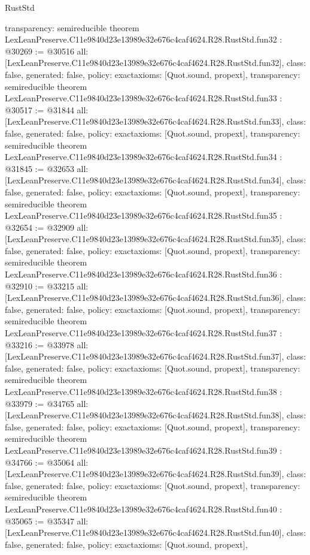 \begin{lexlean}{RustStd}
\begin{coremodule}
{  transparency: semireducible
}
theorem LexLeanPreserve.C11e9840d23e13989e32e676c4caf4624.R28.RustStd.fun32 : @30269 := @30516 {
  all: [LexLeanPreserve.C11e9840d23e13989e32e676c4caf4624.R28.RustStd.fun32],
  class: false,
  generated: false,
  policy: exact{axioms: [Quot.sound, propext]},
  transparency: semireducible
}
theorem LexLeanPreserve.C11e9840d23e13989e32e676c4caf4624.R28.RustStd.fun33 : @30517 := @31844 {
  all: [LexLeanPreserve.C11e9840d23e13989e32e676c4caf4624.R28.RustStd.fun33],
  class: false,
  generated: false,
  policy: exact{axioms: [Quot.sound, propext]},
  transparency: semireducible
}
theorem LexLeanPreserve.C11e9840d23e13989e32e676c4caf4624.R28.RustStd.fun34 : @31845 := @32653 {
  all: [LexLeanPreserve.C11e9840d23e13989e32e676c4caf4624.R28.RustStd.fun34],
  class: false,
  generated: false,
  policy: exact{axioms: [Quot.sound, propext]},
  transparency: semireducible
}
theorem LexLeanPreserve.C11e9840d23e13989e32e676c4caf4624.R28.RustStd.fun35 : @32654 := @32909 {
  all: [LexLeanPreserve.C11e9840d23e13989e32e676c4caf4624.R28.RustStd.fun35],
  class: false,
  generated: false,
  policy: exact{axioms: [Quot.sound, propext]},
  transparency: semireducible
}
theorem LexLeanPreserve.C11e9840d23e13989e32e676c4caf4624.R28.RustStd.fun36 : @32910 := @33215 {
  all: [LexLeanPreserve.C11e9840d23e13989e32e676c4caf4624.R28.RustStd.fun36],
  class: false,
  generated: false,
  policy: exact{axioms: [Quot.sound, propext]},
  transparency: semireducible
}
theorem LexLeanPreserve.C11e9840d23e13989e32e676c4caf4624.R28.RustStd.fun37 : @33216 := @33978 {
  all: [LexLeanPreserve.C11e9840d23e13989e32e676c4caf4624.R28.RustStd.fun37],
  class: false,
  generated: false,
  policy: exact{axioms: [Quot.sound, propext]},
  transparency: semireducible
}
theorem LexLeanPreserve.C11e9840d23e13989e32e676c4caf4624.R28.RustStd.fun38 : @33979 := @34765 {
  all: [LexLeanPreserve.C11e9840d23e13989e32e676c4caf4624.R28.RustStd.fun38],
  class: false,
  generated: false,
  policy: exact{axioms: [Quot.sound, propext]},
  transparency: semireducible
}
theorem LexLeanPreserve.C11e9840d23e13989e32e676c4caf4624.R28.RustStd.fun39 : @34766 := @35064 {
  all: [LexLeanPreserve.C11e9840d23e13989e32e676c4caf4624.R28.RustStd.fun39],
  class: false,
  generated: false,
  policy: exact{axioms: [Quot.sound, propext]},
  transparency: semireducible
}
theorem LexLeanPreserve.C11e9840d23e13989e32e676c4caf4624.R28.RustStd.fun40 : @35065 := @35347 {
  all: [LexLeanPreserve.C11e9840d23e13989e32e676c4caf4624.R28.RustStd.fun40],
  class: false,
  generated: false,
  policy: exact{axioms: [Quot.sound, propext]},
}
\end{coremodule}
\end{lexlean}
